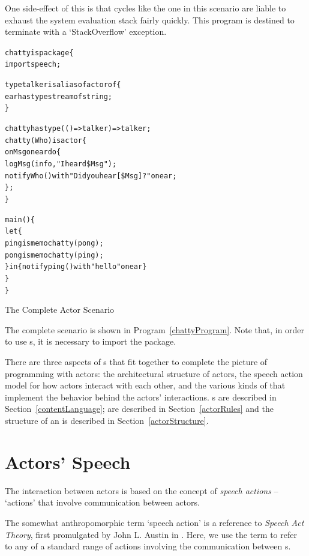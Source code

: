 \begin{aside}
One side-effect of this is that cycles like the one in this scenario are liable to exhaust the system evaluation stack fairly quickly. This program is destined to terminate with a `StackOverflow' exception.
\end{aside}

\begin{program}
\begin{alltt}
chatty is package\{
  import speech;
  
  type talker is alias of actor of \{
    ear has type stream of string;
  \}

  chatty has type (()=>talker)=>talker;
  chatty(Who) is actor\{
    on Msg on ear do\{
      logMsg(info,"I heard \$Msg");
      notify Who() with "Did you hear [\$Msg]?" on ear;
    \};
  \}
  
  main()\{
    let\{
      ping is memo chatty(pong);
      pong is memo chatty(ping);
    \} in \{ notify ping() with "hello" on ear \}
  \}
\}
\end{alltt}
\caption{The Complete  Actor Scenario}
\label{chattyProgram}
\end{program}
The complete scenario is shown in Program~\vref{chattyProgram}. Note that, in order to use s, it is necessary to import the  package.

There are three aspects of s that fit together to complete the picture of programming with actors: the architectural structure of actors, the speech action model for how actors interact with each other, and the various kinds of  that implement the behavior behind the actors' interactions. s are described in Section~\vref{contentLanguage};  are described in Section~\vref{actorRules} and the structure of an  is described in Section~\vref{actorStructure}.

\section{Actors' Speech}
\label{contentLanguage}

The interaction between actors is based on the concept of \emph{speech actions} -- `actions' that involve communication between actors.

\begin{aside}
The somewhat anthropomorphic term `speech action' is a reference to \emph{Speech Act Theory}, first promulgated by John L. Austin in \cite{austin:60}. Here, we use the term to refer to any of a standard range of actions involving the communication between s.
\end{aside}

